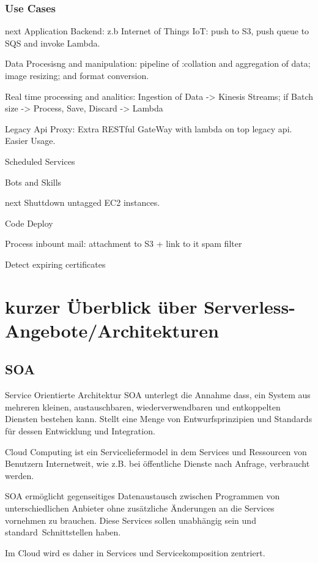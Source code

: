 \documentclass[
12pt,
english,
ngerman,
headsepline,
twoside,
openright,
numbers=noenddot,version=first
]{scrreprt}
\begin{document}
\subsection{Use Cases}
next\cite{serverlessArchAWS}
Application Backend: z.b Internet of Things IoT: push to S3, push queue to SQS and invoke Lambda.

Data Procesisng and manipulation: pipeline of :collation and aggregation of data; image resizing;
and format conversion.

Real time processing and analitics: Ingestion of Data -> Kinesis Streams; if Batch size -> Process, Save, Discard -> Lambda

Legacy Api Proxy: Extra RESTful GateWay with lambda on top legacy api. Easier Usage.

Scheduled Services

Bots and Skills

next\cite{lambdaAWS}
Shuttdown untagged EC2 instances. 

Code Deploy

Process inbount mail: 
attachment to S3 + link to it
spam filter

Detect expiring certificates



\chapter{kurzer Überblick über Serverless-Angebote/Architekturen}

\section{SOA}
\label{sec:soa}
Service Orientierte Architektur SOA unterlegt die Annahme dass, ein System aus mehreren kleinen, austauschbaren, wiederverwendbaren und entkoppelten Diensten bestehen kann. Stellt eine Menge von Entwurfsprinzipien und Standards für dessen Entwicklung und Integration\cite{cloudEssentials}.

Cloud Computing ist ein Serviceliefermodel in dem Services und Ressourcen von Benutzern Internetweit, wie z.B. bei öffentliche Dienste nach Anfrage, verbraucht werden.

SOA ermöglicht gegenseitiges Datenaustausch zwischen Programmen von unterschiedlichen Anbieter ohne zusätzliche Änderungen an die Services vornehmen zu brauchen. Diese Services sollen unabhängig sein und \glqq standard\grqq\ Schnittstellen haben. 

Im Cloud wird es daher in Services und Servicekomposition zentriert.
\end{document}
